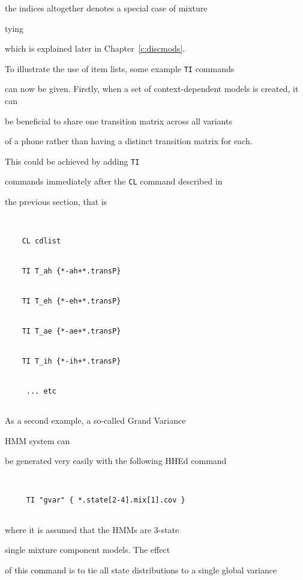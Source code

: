 the indices  altogether denotes a special case of mixture 


tying


which is explained later in Chapter~\ref{c:discmods}.





To illustrate the use of item lists, some example \texttt{TI} commands


can now be given.  Firstly, when a set of context-dependent models is created, it can


be beneficial to share one transition matrix across all variants


of a phone rather than having a distinct transition matrix for each.


This could be achieved by adding \texttt{TI}


commands immediately after the \texttt{CL} command described in


the previous section, that is


\begin{verbatim}


    CL cdlist


    TI T_ah {*-ah+*.transP}


    TI T_eh {*-eh+*.transP}


    TI T_ae {*-ae+*.transP}


    TI T_ih {*-ih+*.transP}


     ... etc


\end{verbatim}





As a second example, a so-called Grand Variance 


HMM system can


be generated very easily with the following HHEd command


\begin{verbatim}


     TI "gvar" { *.state[2-4].mix[1].cov }


\end{verbatim}


where it is assumed that the HMMs are 3-state 


single mixture component models.   The effect


of this command is to tie all state distributions to a single global variance


